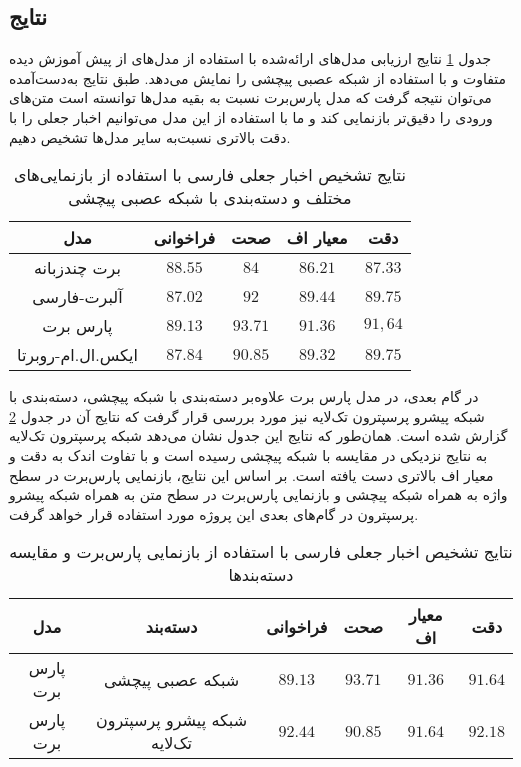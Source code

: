 \subsection{نتایج}
جدول \ref{table.text_result_cnn} نتایج ارزیابی مدل‌های ارائه‌شده با استفاده از مدل‌های از پیش آموزش‌ دیده متفاوت و با استفاده از شبکه عصبی پیچشی را نمایش می‌دهد. طبق نتایج به‌دست‌آمده می‌توان نتیجه گرفت که مدل پارس‌برت نسبت‌ به بقیه‌ مدل‌ها توانسته‌ است متن‌های ورودی را دقیق‌تر بازنمایی کند و ما با استفاده از این مدل می‌توانیم اخبار جعلی را با دقت بالاتری نسبت‌به سایر مدل‌ها تشخیص دهیم.

\begin{table}
	\caption{نتایج تشخیص اخبار جعلی فارسی با استفاده از بازنمایی‌های مختلف و دسته‌بندی با شبکه عصبی پیچشی}
	\label{table.text_result_cnn}
	\begin{center}
		\begin{tabular}{|c|c|c|c|c|}
			\hline
مدل & فراخوانی & صحت & معیار اف & دقت \\
			\hline
			\hline
برت چندزبانه & $88.55$ & $84$ & $86.21$ & $87.33$\\
			\hline
آلبرت-فارسی & $87.02$ & $92$ & $89.44$ & $89.75$ \\
			\hline
پارس برت & $89.13$ & $93.71$ & $91.36$ & $91,64$ \\
			\hline
ایکس.ال.ام-روبرتا & $87.84$ & $90.85$ & $89.32$ & $89.75$ \\
			\hline
		\end{tabular}
	\end{center}
\end{table}

در گام بعدی، در مدل پارس برت علاوه‌بر دسته‌بندی با شبکه پیچشی، دسته‌بندی با شبکه پیشرو پرسپترون تک‌لایه نیز مورد بررسی قرار گرفت که نتایج آن در جدول \ref{table.text_result_slp} گزارش شده‌ است. همان‌طور که نتایج این جدول نشان می‌دهد شبکه پرسپترون تک‌لایه به نتایج نزدیکی در مقایسه با شبکه پیچشی رسیده‌ است و با تفاوت اندک به دقت و معیار اف بالاتری دست یافته ‌است. بر اساس این نتایج، بازنمایی پارس‌برت در سطح واژه به‌ همراه شبکه پیچشی و بازنمایی پارس‌برت در سطح متن به همراه شبکه پیشرو پرسپترون در گام‌های بعدی این پروژه مورد استفاده قرار خواهد گرفت.

\begin{table}
	\caption{نتایج تشخیص اخبار جعلی فارسی با استفاده از بازنمایی پارس‌برت و مقایسه دسته‌بندها}
	\label{table.text_result_slp}
	\begin{center}
		\begin{tabular}{|c|c|c|c|c|c|}
			\hline
مدل & دسته‌بند & فراخوانی & صحت & معیار اف & دقت \\
			\hline
			\hline
پارس برت & شبکه عصبی پیچشی  & $89.13$ & $93.71$ & $91.36$ & $91.64$ \\
			\hline
پارس برت & شبکه پیشرو پرسپترون تک‌لایه & $92.44$ & $90.85$ & $91.64$ & $92.18$ \\
			\hline
		\end{tabular}
	\end{center}
\end{table}


